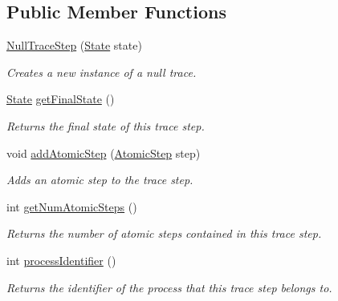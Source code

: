\subsection*{Public Member Functions}
\begin{DoxyCompactItemize}
\item 
\hyperlink{classedu_1_1udel_1_1cis_1_1vsl_1_1civl_1_1kripke_1_1common_1_1NullTraceStep_a710be16bbda24e7e0a0bd33e53e7dbc9}{Null\+Trace\+Step} (\hyperlink{interfaceedu_1_1udel_1_1cis_1_1vsl_1_1civl_1_1state_1_1IF_1_1State}{State} state)
\begin{DoxyCompactList}\small\item\em Creates a new instance of a null trace. \end{DoxyCompactList}\item 
\hyperlink{interfaceedu_1_1udel_1_1cis_1_1vsl_1_1civl_1_1state_1_1IF_1_1State}{State} \hyperlink{classedu_1_1udel_1_1cis_1_1vsl_1_1civl_1_1kripke_1_1common_1_1NullTraceStep_a96d384d7f595e1977fc7f594fabca2ad}{get\+Final\+State} ()
\begin{DoxyCompactList}\small\item\em Returns the final state of this trace step. \end{DoxyCompactList}\item 
void \hyperlink{classedu_1_1udel_1_1cis_1_1vsl_1_1civl_1_1kripke_1_1common_1_1NullTraceStep_a3f9eed97e38c6fe8a4c86ee084e275c2}{add\+Atomic\+Step} (\hyperlink{interfaceedu_1_1udel_1_1cis_1_1vsl_1_1civl_1_1kripke_1_1IF_1_1AtomicStep}{Atomic\+Step} step)
\begin{DoxyCompactList}\small\item\em Adds an atomic step to the trace step. \end{DoxyCompactList}\item 
int \hyperlink{classedu_1_1udel_1_1cis_1_1vsl_1_1civl_1_1kripke_1_1common_1_1NullTraceStep_a0d5a53cde4e4f398bdc25dc87b52df56}{get\+Num\+Atomic\+Steps} ()
\begin{DoxyCompactList}\small\item\em Returns the number of atomic steps contained in this trace step. \end{DoxyCompactList}\item 
int \hyperlink{classedu_1_1udel_1_1cis_1_1vsl_1_1civl_1_1kripke_1_1common_1_1NullTraceStep_a232e1d4a2e9891d0615d862ce39da62f}{process\+Identifier} ()
\begin{DoxyCompactList}\small\item\em Returns the identifier of the process that this trace step belongs to. \end{DoxyCompactList}\item 

\end{DoxyCompactItemize}
